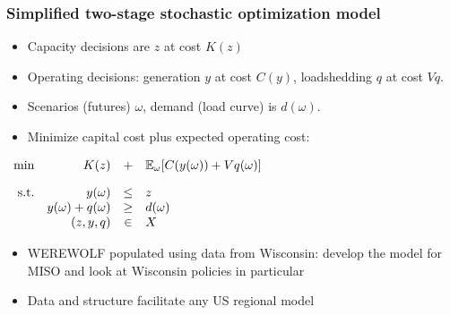\documentclass[xcolor=dvipsnames]{beamer}
\newcommand{\expect}{\mathbb{E}}
\begin{document}
\begin{frame}
\frametitle{Simplified two-stage stochastic optimization model}
\begin{itemize}
\item Capacity decisions are $z$ at cost $K(z)$
\item Operating decisions: generation $y$ at cost $C(y)$,
loadshedding $q$ at cost $Vq$.
\item Scenarios (futures) $\omega$, demand (load curve) is $d(\omega)$.
\item Minimize capital cost plus expected operating cost:
\end{itemize}
\begin{center}
$%
\begin{array}{rrcl}
\min & \quad K(z)  & + & \expect_{\omega }[%
C(y(\omega )) + Vq(\omega)] \\[1em]
\text{s.t.} & \quad
\textcolor{black}{y(\omega)} & \textcolor{black}{\leq} & %
\textcolor{black}{z} \\
& \textcolor{black}{y(\omega) + q(\omega)} & \textcolor{black}{\geq} & %
                                                                       \textcolor{black}{d(\omega)}
  \\
& (z, y, q) & \in & X
\end{array}%
$
\end{center}
\begin{itemize}
\item WEREWOLF populated using data from Wisconsin: develop the model
  for MISO and look at Wisconsin policies in particular
\item Data and structure facilitate any US
  regional model
\end{itemize}
\end{frame}
\end{document}
